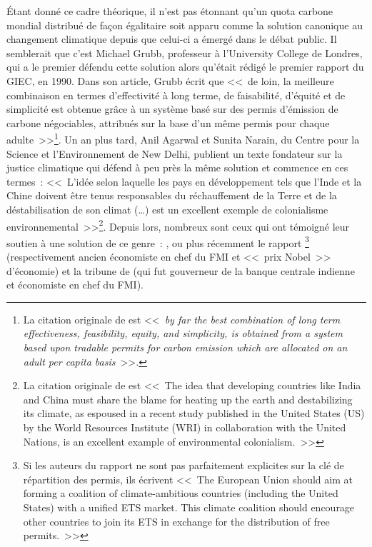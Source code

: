 \documentclass[a5paper,french]{memoir}
\begin{document}
Étant donné ce cadre théorique, il n'est pas étonnant qu'un quota carbone mondial distribué de façon égalitaire soit apparu comme la solution canonique au changement climatique depuis que celui-ci a émergé dans le débat public. Il semblerait que c'est Michael Grubb, professeur à l'University College de Londres, qui a le premier défendu cette solution alors qu'était rédigé le premier rapport du GIEC, en 1990. Dans son article, Grubb écrit que <<~de loin, la meilleure combinaison en termes d'effectivité à long terme, de faisabilité, d'équité et de simplicité est obtenue grâce à un système basé sur des permis d'émission de carbone négociables, attribués sur la base d'un même permis pour chaque adulte~>>\footnote{La citation originale de \citet{grubb_greenhouse_1990} est <<~\textit{by far the best combination of long term effectiveness, feasibility, equity, and simplicity, is obtained from a system based upon tradable permits for carbon emission which are allocated on an adult per capita basis}~>>.}. Un an plus tard, Anil Agarwal et Sunita Narain, du Centre pour la Science et l'Environnement de New Delhi, publient un texte fondateur sur la justice climatique qui défend à peu près la même solution et commence en ces termes~: <<~L'idée selon laquelle les pays en développement tels que l'Inde et la Chine doivent être tenus responsables du réchauffement de la Terre et de la déstabilisation de son climat (\dots) est un excellent exemple de colonialisme environnemental~>>\footnote{La citation originale de \citet{agarwal_global_1991} est <<~The idea that developing countries like India and China must share the blame for heating up the earth and destabilizing its climate, as espoused in a recent study published in the United States (US) by the World Resources Institute (WRI) in collaboration with the United Nations, is an excellent example of environmental colonialism.~>>}. Depuis lors, nombreux sont ceux qui ont témoigné leur soutien à une solution de ce genre~: \citet{bertram_tradeable_1992,baer_equity_2000,jamieson_climate_2001}, ou plus récemment le rapport \citet{blanchard_major_2021}\footnote{Si les auteurs du rapport ne sont pas parfaitement explicites sur la clé de répartition des permis, ils écrivent <<~The European Union should aim at forming a coalition of climate-ambitious countries (including the United States) with a unified ETS market. This climate coalition should encourage other countries to join its ETS in exchange for the distribution of free permits.~>>} (respectivement ancien économiste en chef du FMI et <<~prix Nobel~>> d'économie) et la tribune de \citet{rajan_global_2021} (qui fut gouverneur de la banque centrale indienne et économiste en chef du FMI). 
\end{document}
